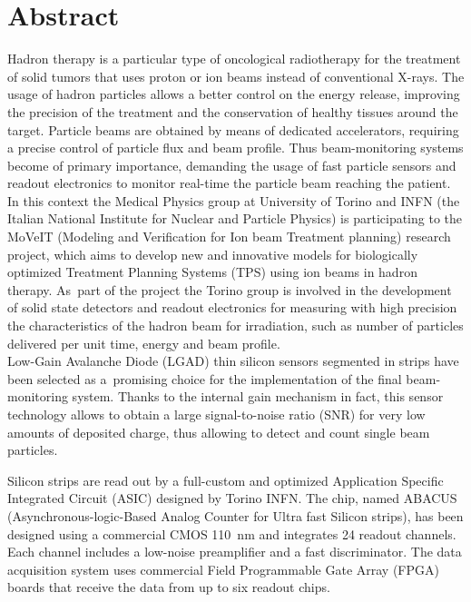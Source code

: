 
\chapter*{Abstract}
Hadron therapy is a particular type of oncological radiotherapy for the treatment of solid tumors that uses proton or
ion beams instead of conventional X-rays. The usage of hadron particles allows a better control on the energy release,
improving the precision of the treatment and the conservation of healthy tissues around the target.
Particle beams are obtained by means of dedicated accelerators, requiring a precise control of particle flux and beam profile.
Thus beam-monitoring systems become of primary importance, demanding the usage of fast particle sensors and readout electronics to monitor
real-time the particle beam reaching the patient.\\

In this context the Medical Physics group at University of Torino and INFN (the Italian National Institute for
Nuclear and Particle Physics) is participating to
the MoVeIT (Modeling and Verification for Ion beam Treatment planning) research project, which aims to develop new and
innovative models for biologically optimized Treatment Planning Systems (TPS) using ion beams in hadron therapy.
As~part of the project the Torino group is involved in the development of solid state detectors and readout electronics for measuring with high precision
the characteristics of the hadron beam for irradiation, such as number of particles delivered per unit time, energy and beam profile.\\

Low-Gain Avalanche Diode (LGAD) thin silicon sensors segmented in strips have been selected as a~promising choice for the implementation
of the final beam-monitoring system. Thanks to the internal gain mechanism in fact, this sensor technology allows to obtain a large
signal-to-noise ratio (SNR) for very low amounts of deposited charge, thus allowing to detect and count single beam particles.

\noindent Silicon strips are read out by a full-custom and optimized Application Specific Integrated Circuit (ASIC) designed by Torino INFN.
The chip, named ABACUS (Asynchronous-logic-Based Analog Counter for Ultra fast Silicon strips), has been 
designed using a commercial CMOS 110~nm and integrates 24 readout channels. Each channel includes a low-noise preamplifier 
and a fast discriminator. The data acquisition system uses commercial Field Programmable Gate Array (FPGA) boards that receive
the data from up to six readout chips.\\

